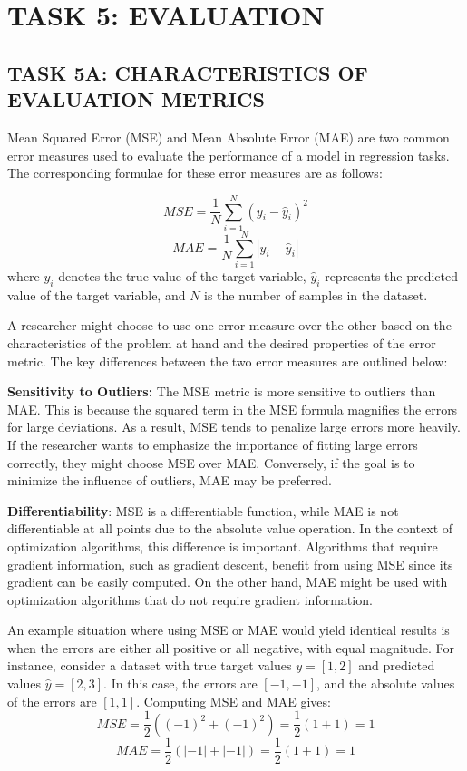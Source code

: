 \section{TASK 5: EVALUATION}

\subsection{TASK 5A: CHARACTERISTICS OF EVALUATION METRICS}
Mean Squared Error (MSE) and Mean Absolute Error (MAE) are two common error measures used to evaluate the performance of a model in regression tasks. The corresponding formulae for these error measures are as follows:

$$
M S E=\frac{1}{N} \sum_{i=1}^N\left(y_i-\hat{y}_i\right)^2
$$
$$
M A E=\frac{1}{N} \sum_{i=1}^N\left|y_i-\hat{y}_i\right|
$$
where $y_i$ denotes the true value of the target variable, $\hat{y}_i$ represents the predicted value of the target variable, and $N$ is the number of samples in the dataset.

A researcher might choose to use one error measure over the other based on the characteristics of the problem at hand and the desired properties of the error metric. The key differences between the two error measures are outlined below:

\textbf{Sensitivity to Outliers:} The MSE metric is more sensitive to outliers than MAE. This is because the squared term in the MSE formula magnifies the errors for large deviations. As a result, MSE tends to penalize large errors more heavily. If the researcher wants to emphasize the importance of fitting large errors correctly, they might choose MSE over MAE. Conversely, if the goal is to minimize the influence of outliers, MAE may be preferred.

\textbf{Differentiability}: MSE is a differentiable function, while MAE is not differentiable at all points due to the absolute value operation. In the context of optimization algorithms, this difference is important. Algorithms that require gradient information, such as gradient descent, benefit from using MSE since its gradient can be easily computed. On the other hand, MAE might be used with optimization algorithms that do not require gradient information.

An example situation where using MSE or MAE would yield identical results is when the errors are either all positive or all negative, with equal magnitude. For instance, consider a dataset with true target values $y = [1, 2]$ and predicted values $\hat{y} = [2, 3]$. In this case, the errors are $[-1, -1]$, and the absolute values of the errors are $[1, 1]$. Computing MSE and MAE gives:
$$
M S E=\frac{1}{2}\left((-1)^2+(-1)^2\right)=\frac{1}{2}(1+1)=1
$$
$$
M A E=\frac{1}{2}(|-1|+|-1|)=\frac{1}{2}(1+1)=1
$$